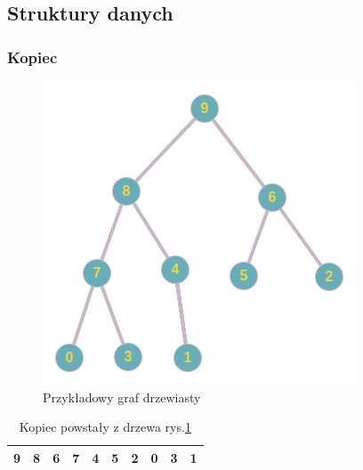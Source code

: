 \documentclass{classrep}
\begin{document}
\subsection{Struktury danych}
\subsubsection{Kopiec}
\begin{table}[H]
    \begin{minipage}[b]{0.45\linewidth}\centering
        \begin{figure}[H]
            \includegraphics[width=\textwidth]{heap.png}
            \caption{Przykładowy graf drzewiasty}
            \label{heap:graph}
        \end{figure}
    \end{minipage}
    \hspace{0.5cm}
    \begin{minipage}[b]{0.45\linewidth}
    \centering
    \begin{tabular}{|l||l|l||l|l|l|l||l|l|l|}
        \hline
        9 & 8 & 6 & 7 & 4 & 5 & 2 & 0 & 3 & 1 \\ \hline
        \end{tabular}
        \caption{Kopiec powstały z drzewa rys.\ref{heap:graph}}
        \label{heap:table}
    \end{minipage}
    \end{table}
\end{document}
